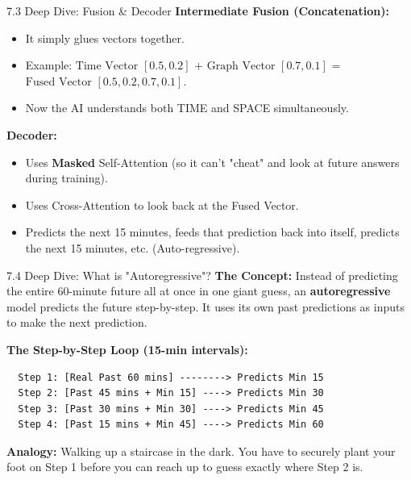\documentclass[aspectratio=169]{beamer}
\begin{document}
\begin{frame}{7.3 Deep Dive: Fusion \& Decoder}
    \textbf{Intermediate Fusion (Concatenation):}
    \begin{itemize}
        \item It simply glues vectors together. 
        \item Example: $\text{Time Vector } [0.5, 0.2]$ + $\text{Graph Vector } [0.7, 0.1]$ = $\text{Fused Vector } [0.5, 0.2, 0.7, 0.1]$.
        \item Now the AI understands both TIME and SPACE simultaneously.
    \end{itemize}

    \vspace{0.2cm}
    \textbf{Decoder:}
    \begin{itemize}
        \item Uses \textbf{Masked} Self-Attention (so it can't "cheat" and look at future answers during training).
        \item Uses Cross-Attention to look back at the Fused Vector.
        \item Predicts the next 15 minutes, feeds that prediction back into itself, predicts the next 15 minutes, etc. (Auto-regressive).
    \end{itemize}
\end{frame}

\begin{frame}[fragile]{7.4 Deep Dive: What is "Autoregressive"?}
  \textbf{The Concept:}
  Instead of predicting the entire 60-minute future all at once in one giant guess, an \textbf{autoregressive} model predicts the future step-by-step. It uses its own past predictions as inputs to make the next prediction.

  \vspace{0.2cm}
  \textbf{The Step-by-Step Loop (15-min intervals):}
  \begin{verbatim}
  Step 1: [Real Past 60 mins] --------> Predicts Min 15
  Step 2: [Past 45 mins + Min 15] ----> Predicts Min 30
  Step 3: [Past 30 mins + Min 30] ----> Predicts Min 45
  Step 4: [Past 15 mins + Min 45] ----> Predicts Min 60
  \end{verbatim}

  \vspace{0.2cm}
  \textbf{Analogy:} Walking up a staircase in the dark. You have to securely plant your foot on Step 1 before you can reach up to guess exactly where Step 2 is.
\end{frame}
\end{document}
